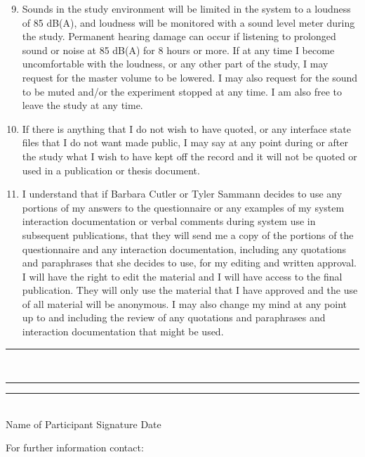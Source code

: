 \documentclass[10pt]{article}
\begin{document}
\begin{enumerate}
\setcounter{enumi}{8}

\item Sounds in the study environment will be limited in the system to a loudness of
  85 dB(A), and loudness will be monitored with a sound level meter during the study. 
  Permanent hearing damage can occur if listening to prolonged sound or noise
  at 85 dB(A) for 8 hours or more. If at any time I become uncomfortable with the 
  loudness, or any other part of the study, I may request for the master volume to be
  lowered. I may also request for the sound to be muted and/or the experiment stopped at
  any time. I am also free to leave the study at any time.
  
\item If there is anything that I do not wish to have quoted, or any
  interface state files that I do not want made public, I may say at any
  point during or after the study what I wish to have kept off the
  record and it will not be quoted or used in a publication or thesis document.

\item I understand that if Barbara Cutler or Tyler Sammann decides to use any portions
  of my answers to the questionnaire or any examples of my system interaction
  documentation or verbal comments during system use in subsequent publications, that
  they will send me a copy of the portions of the questionnaire and any
  interaction documentation, including any quotations and paraphrases that she decides
  to use, for my editing and written approval. I will have the right
  to edit the material and I will have access to the final publication. They
  will only use the material that I have approved and the use of all
  material will be anonymous. I may also change my mind at any point
  up to and including the review of any quotations and paraphrases and
  interaction documentation that might be used.

\end{enumerate}

\vspace{0.5in}

\noindent
\rule{2.6in}{1pt}~~~~\rule{2.6in}{1pt}\hfill \rule{1in}{1pt}\\
\hspace*{0.7in}Name of Participant 
\hfill Signature \hspace{1.3in} 
Date \hspace{0.3in}

\vspace{0.15in}
\noindent
For further information contact:
\end{document}
